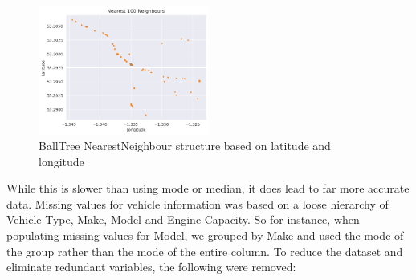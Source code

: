 \begin{figure}[h]
    \centering
    \includegraphics[width=0.5\textwidth]{images/Figure_BallTree}
    \caption{BallTree NearestNeighbour structure based on latitude and longitude}
    \label{fig:balltree}
\end{figure}

While this is slower than using mode or median, it does lead to far more accurate data.
Missing values for vehicle information was based on a loose hierarchy of Vehicle Type, Make, Model and Engine Capacity.
So for instance, when populating missing values for Model, we grouped by Make and used the mode of the group rather than the mode of the entire column.
To reduce the dataset and eliminate redundant variables, the following were removed:
